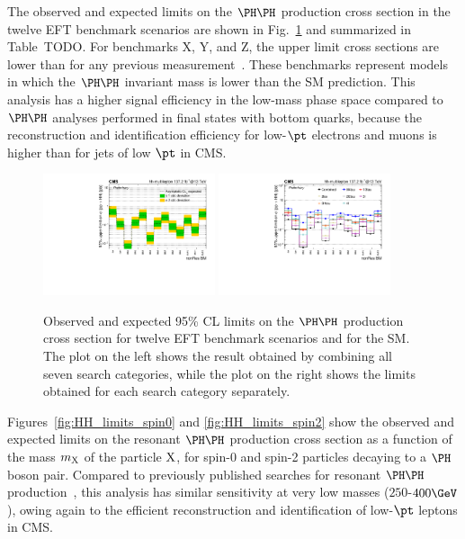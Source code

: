 The observed and expected limits on the $\HH$ production cross section in the
twelve EFT benchmark scenarios are shown in Fig.~\ref{fig:HH_limits_EFT}
and summarized in Table~TODO.
For benchmarks X, Y, and Z, the upper limit cross sections are lower
than for any previous measurement~\cite{Sirunyan:2745738}.
These benchmarks represent models in which the $\HH$ invariant mass is
lower than the SM prediction.  This analysis has a higher signal efficiency
in the low-mass phase space compared to $\HH$ analyses performed in final states with bottom quarks,
because the reconstruction and identification efficiency for low-$\pt$ electrons and muons is higher than for jets of low $\pt$ in CMS.

\begin{figure}
  \centering
  \includegraphics[width=0.45\textwidth]{figures/bmScan_multilepton_RUN2.pdf}
  \hspace{0.05\textwidth}
  \includegraphics[width=0.45\textwidth]{figures/multiBMScan_multilepton_Run2.pdf}
  \caption{
    Observed and expected 95\% CL limits on the $\HH$ production cross section for
    twelve EFT benchmark scenarios and for the SM.
    The plot on the left shows the result obtained by combining all seven search categories,
    while the plot on the right shows the limits obtained for each search category separately. 
  }
  \label{fig:HH_limits_EFT}
\end{figure}

Figures~\ref{fig:HH_limits_spin0} and \ref{fig:HH_limits_spin2} show the observed and
expected limits on the resonant $\HH$ production cross section as a function of the mass $m_{\textrm{X}}$ of the particle $\textrm{X}$,
for spin-0 and spin-2 particles decaying to a $\PHiggs$ boson pair.
Compared to previously published searches for resonant $\HH$
production~\cite{Sirunyan:2018ayu,2020135103},
this analysis has similar sensitivity at very low masses ($250$-$400\GeV$),
owing again to the efficient reconstruction and identification of low-$\pt$ leptons in CMS.

